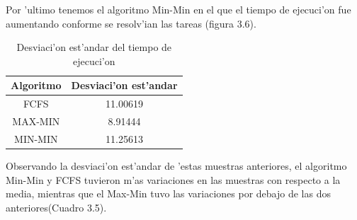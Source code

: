 \bigskip
Por 'ultimo tenemos el algoritmo Min-Min en el que el tiempo de ejecuci'on fue aumentando conforme se resolv'ian las tareas (figura 3.6).

\begin{table}[]
	\centering
	\caption{Desviaci'on est'andar del tiempo de ejecuci'on}
	\label{my-label}
	\begin{tabular}{@{}cc@{}}
		\toprule
		{\bf Algoritmo} & \multicolumn{1}{l}{{\bf Desviaci'on est'andar}} \\ \midrule
		FCFS & 11.00619 \\
		MAX-MIN & 8.91444 \\
		MIN-MIN & 11.25613 \\ \bottomrule
	\end{tabular}
\end{table}

Observando la desviaci'on est'andar de 'estas muestras anteriores, el algoritmo Min-Min y FCFS tuvieron m'as variaciones en las muestras con respecto a la media, mientras que el Max-Min tuvo las variaciones por debajo de las dos anteriores(Cuadro 3.5).